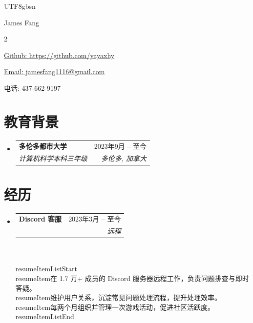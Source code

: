 \documentclass[letterpaper,10pt]{article}
\makeatletter
\newcommand{\resumeItem}[1]{
  \item\small{
    {#1 \vspace{-2pt}}
  }
}
\newcommand{\resumeSubheading}[4]{
  \vspace{-2pt}\item
    \begin{tabular*}{0.97\textwidth}[t]{l@{\extracolsep{\fill}}r}
      \textbf{#1} & #2 \\
      \textit{\small#3} & \textit{\small #4} \\
    \end{tabular*}\vspace{5pt}
}
\newcommand{\resumeSubHeadingListStart}{\begin{itemize}[leftmargin=0.15in, label={}]}
\newcommand{\resumeSubHeadingListEnd}{\end{itemize}}
\newcommand{\resumeItemListStart}{\begin{itemize}}
\newcommand{\resumeItemListEnd}{\end{itemize}\vspace{-5pt}}
\newcommand{\Name}[1]{\fontsize{28}{30}\selectfont #1}
\makeatother
\begin{document}
\begin{CJK}{UTF8}{gbsn}



\begin{center}
    {\Name James Fang}  \\ \vspace{-2pt}
    \begin{multicols}{2}
    \begin{flushleft}
    \href{{https://github.com/YaYa-xhy}}{Github: https://github.com/yayaxhy}\\
    \end{flushleft}
    
    \begin{flushright}
    \href{mailto:jamesfang1116@gmail.com}{Email: jamesfang1116@gmail.com}
    \item{电话: 437-662-9197}
    \end{flushright}
    \end{multicols}
\end{center}


\vspace{-20pt}
\section{教育背景}
  \resumeSubHeadingListStart
      \resumeSubheading
      {多伦多都市大学}{2023年9月 -- 至今}
      {计算机科学本科三年级}{多伦多, 加拿大}

  \resumeSubHeadingListEnd
      



\section{经历}
 \resumeSubHeadingListStart
 \resumeSubheading 
      {Discord 客服}{2023年3月 -- 至今}
      {} {远程}\\ 
      \\resumeItemListStart
        \\resumeItem{在 1.7 万+ 成员的 Discord 服务器远程工作，负责问题排查与即时答疑。}
        \\resumeItem{维护用户关系，沉淀常见问题处理流程，提升处理效率。}
        \\resumeItem{每两个月组织并管理一次游戏活动，促进社区活跃度。}
      \\resumeItemListEnd
      
  \resumeSubHeadingListEnd
  

\end{CJK}
\end{document}
